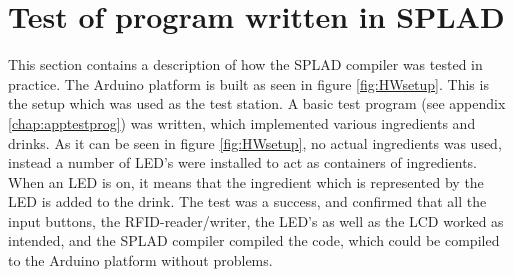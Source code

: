 \section{Test of program written in SPLAD}
This section contains a description of how the SPLAD compiler was tested in practice. The Arduino platform is built as seen in figure \ref{fig:HWsetup}. This is the setup which was used as the test station. A basic test program (see appendix \ref{chap:apptestprog}) was written, which implemented various ingredients and drinks. As it can be seen in figure \ref{fig:HWsetup}, no actual ingredients was used, instead a number of LED's were installed to act as containers of ingredients. When an LED is on, it means that the ingredient which is represented by the LED is added to the drink. The test was a success, and confirmed that all the input buttons, the RFID-reader/writer, the LED's as well as the LCD worked as intended, and the SPLAD compiler compiled the code, which could be compiled to the Arduino platform without problems.